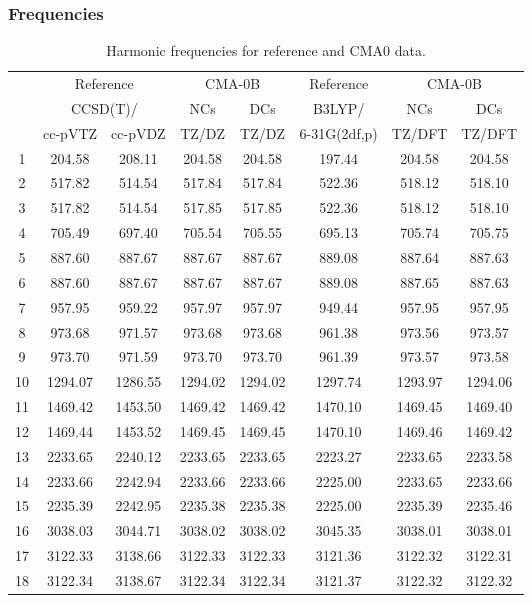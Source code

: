 \documentclass[10pt,oneside]{article}
\begin{document}
\subsubsection*{Frequencies}
\begin{table}[h!]
\centering
\caption{Harmonic frequencies for reference and CMA0 data.}
\begin{tabular}{cccccccc}
\toprule
{} & \multicolumn{2}{c}{Reference} & \multicolumn{2}{c}{CMA-0B} &    Reference & \multicolumn{2}{c}{CMA-0B} \\
{} & \multicolumn{2}{c}{CCSD(T)/} &     NCs &     DCs &       B3LYP/ &     NCs &     DCs \\
{} &   cc-pVTZ & cc-pVDZ &   TZ/DZ &   TZ/DZ & 6-31G(2df,p) &  TZ/DFT &  TZ/DFT \\
\midrule
1  &    204.58 &  208.11 &  204.58 &  204.58 &       197.44 &  204.58 &  204.58 \\
2  &    517.82 &  514.54 &  517.84 &  517.84 &       522.36 &  518.12 &  518.10 \\
3  &    517.82 &  514.54 &  517.85 &  517.85 &       522.36 &  518.12 &  518.10 \\
4  &    705.49 &  697.40 &  705.54 &  705.55 &       695.13 &  705.74 &  705.75 \\
5  &    887.60 &  887.67 &  887.67 &  887.67 &       889.08 &  887.64 &  887.63 \\
6  &    887.60 &  887.67 &  887.67 &  887.67 &       889.08 &  887.65 &  887.63 \\
7  &    957.95 &  959.22 &  957.97 &  957.97 &       949.44 &  957.95 &  957.95 \\
8  &    973.68 &  971.57 &  973.68 &  973.68 &       961.38 &  973.56 &  973.57 \\
9  &    973.70 &  971.59 &  973.70 &  973.70 &       961.39 &  973.57 &  973.58 \\
10 &   1294.07 & 1286.55 & 1294.02 & 1294.02 &      1297.74 & 1293.97 & 1294.06 \\
11 &   1469.42 & 1453.50 & 1469.42 & 1469.42 &      1470.10 & 1469.45 & 1469.40 \\
12 &   1469.44 & 1453.52 & 1469.45 & 1469.45 &      1470.10 & 1469.46 & 1469.42 \\
13 &   2233.65 & 2240.12 & 2233.65 & 2233.65 &      2223.27 & 2233.65 & 2233.58 \\
14 &   2233.66 & 2242.94 & 2233.66 & 2233.66 &      2225.00 & 2233.65 & 2233.66 \\
15 &   2235.39 & 2242.95 & 2235.38 & 2235.38 &      2225.00 & 2235.39 & 2235.46 \\
16 &   3038.03 & 3044.71 & 3038.02 & 3038.02 &      3045.35 & 3038.01 & 3038.01 \\
17 &   3122.33 & 3138.66 & 3122.33 & 3122.33 &      3121.36 & 3122.32 & 3122.31 \\
18 &   3122.34 & 3138.67 & 3122.34 & 3122.34 &      3121.37 & 3122.32 & 3122.32 \\
\bottomrule
\end{tabular}
\end{table}
\end{document}
